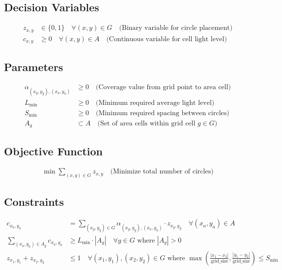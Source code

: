 \documentclass{article}
\begin{document}
\subsection{Decision Variables}
\begin{align}
    z_{x, y} &\in \{0, 1\} \quad \forall (x, y) \in G \quad \text{(Binary variable for circle placement)}\\
    c_{x, y} &\geq 0 \quad \forall (x, y) \in A \quad \text{(Continuous variable for cell light level)}
\end{align}

\subsection{Parameters}
\begin{align}
    \alpha_{(x_g, y_g), (x_a, y_a)} &\geq 0 \quad \text{(Coverage value from grid point to area cell)}\\
    L_{\min} &\geq 0 \quad \text{(Minimum required average light level)}\\
    S_{\min} &\geq 0 \quad \text{(Minimum required spacing between circles)}\\
    A_g &\subset A \quad \text{(Set of area cells within grid cell $g \in G$)}
\end{align}

\subsection{Objective Function}
\begin{align}
    \min \sum_{(x, y) \in G} z_{x, y} \quad \text{(Minimize total number of circles)}
\end{align}

\subsection{Constraints}
\begin{align}
    c_{x_a, y_a} &= \sum_{(x_g, y_g) \in G} \alpha_{(x_g, y_g), (x_a, y_a)} \cdot z_{x_g, y_g} \quad \forall (x_a, y_a) \in A\\
    \sum_{(x_a, y_a) \in A_g} c_{x_a, y_a} &\geq L_{\min} \cdot |A_g| \quad \forall g \in G \text{ where } |A_g| > 0\\
    z_{x_1, y_1} + z_{x_2, y_2} &\leq 1 \quad \forall (x_1,y_1),(x_2,y_2) \in G \text{ where } \max\left(\frac{|x_1-x_2|}{\text{grid\_size}}, \frac{|y_1-y_2|}{\text{grid\_size}}\right) \leq S_{\min}
\end{align}
\end{document}
